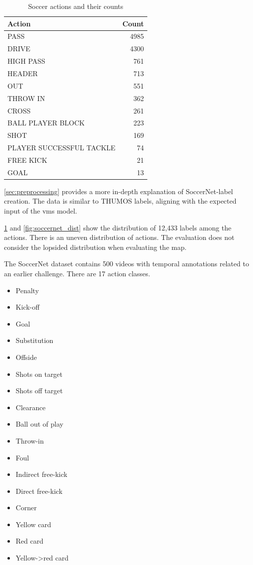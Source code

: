 \begin{table}
    \centering
    \begin{tabular}{lr}
        \toprule
        Action                    & Count \\
        \midrule
        PASS                      & 4985  \\
        DRIVE                     & 4300  \\
        HIGH PASS                 & 761   \\
        HEADER                    & 713   \\
        OUT                       & 551   \\
        THROW IN                  & 362   \\
        CROSS                     & 261   \\
        BALL PLAYER BLOCK         & 223   \\
        SHOT                      & 169   \\
        PLAYER SUCCESSFUL TACKLE  & 74    \\
        FREE KICK                 & 21    \\
        GOAL                      & 13    \\
        \bottomrule
    \end{tabular}
    \caption{Soccer actions and their counts}
    \label{tab:soccer_actions}
\end{table}


\cref{sec:preprocessing} provides a more in-depth explanation of SoccerNet-label creation. The data is similar to THUMOS labels, aligning with the expected input of the \acrshort{vms} model.

\cref{tab:soccer_actions} and \cref{fig:soccernet_dist} show the distribution of 12,433 labels among the actions. There is an uneven distribution of actions. The evaluation does not consider the lopsided distribution when evaluating the \acrshort{map}.

The SoccerNet dataset contains 500 videos with temporal annotations related to an earlier challenge. There are 17 action classes.
\begin{itemize}
    \item Penalty
    \item Kick-off
    \item Goal
    \item Substitution
    \item Offside
    \item Shots on target
    \item Shots off target
    \item Clearance
    \item Ball out of play
    \item Throw-in
    \item Foul
    \item Indirect free-kick
    \item Direct free-kick
    \item Corner
    \item Yellow card
    \item Red card
    \item Yellow->red card
\end{itemize}

